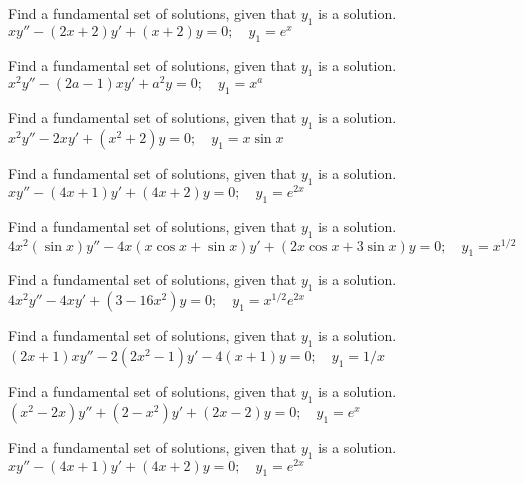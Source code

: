 \documentclass{ximera}
\begin{document}
\begin{problem}\label{exer:5.6.22}
Find a
fundamental set of solutions, given that $y_1$ is a solution. $xy''-(2x+2)y'+(x+2)y=0;   \quad y_1=e^x$
\end{problem}

\begin{problem}\label{exer:5.6.23}
Find a
fundamental set of solutions, given that $y_1$ is a solution. $x^2y''-(2a-1)xy'+a^2y=0;   \quad y_1=x^a$
\end{problem}

\begin{problem}\label{exer:5.6.24}
Find a
fundamental set of solutions, given that $y_1$ is a solution. $x^2y''-2xy'+(x^2+2)y=0;   \quad y_1=x \sin x$
\end{problem}

\begin{problem}\label{exer:5.6.25}
Find a
fundamental set of solutions, given that $y_1$ is a solution. $xy''-(4x+1)y'+(4x+2)y=0;  \quad y_1=e^{2x}$
\end{problem}

\begin{problem}\label{exer:5.6.26}
Find a
fundamental set of solutions, given that $y_1$ is a solution. $4x^2(\sin x)y''-4x(x\cos x+\sin x)y'+(2x\cos x+3\sin x)y=0;  \quad
y_1=x^{1/2}$
\end{problem}

\begin{problem}\label{exer:5.6.27}
Find a
fundamental set of solutions, given that $y_1$ is a solution. $4x^2y''-4xy'+(3-16x^2)y=0;  \quad y_1=x^{1/2}e^{2x}$
\end{problem}

\begin{problem}\label{exer:5.6.28}
Find a
fundamental set of solutions, given that $y_1$ is a solution. $(2x+1)xy''-2(2x^2-1)y'-4(x+1)y=0;  \quad y_1=1/x$
\end{problem}

\begin{problem}\label{exer:5.6.29}
Find a
fundamental set of solutions, given that $y_1$ is a solution. $(x^2-2x)y''+(2-x^2)y'+(2x-2)y=0;  \quad y_1=e^x$
\end{problem}

\begin{problem}\label{exer:5.6.30}
Find a
fundamental set of solutions, given that $y_1$ is a solution. $xy''-(4x+1)y'+(4x+2)y=0;  \quad y_1=e^{2x}$
\end{problem}
\end{document}
